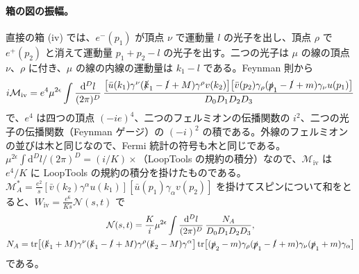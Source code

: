 \documentclass[a4paper,10pt]{ltjsarticle}
\newcommand{\dd}{\mathrm{d}}
\begin{document}
\paragraph{箱の図の振幅。}直接の箱 (iv) では、$e^-(p_1)$ が頂点 $\nu$ で運動量 $l$ の光子を出し、頂点 $\rho$ で $e^+(p_2)$ と消えて運動量 $p_1+p_2-l$ の光子を出す。二つの光子は $\mu$ の線の頂点 $\nu$、$\rho$ に付き、$\mu$ の線の内線の運動量は $k_1-l$ である。Feynman 則から
\begin{equation*}
i\mathcal M_{\mathrm{iv}}=e^4\mu^{2\epsilon}\int\frac{\dd^Dl}{(2\pi)^D}\,\frac{\bigl[\bar u(k_1)\gamma^\nu(\slashed k_1-\slashed l+M)\gamma^\rho v(k_2)\bigr]\bigl[\bar v(p_2)\gamma_\rho(\slashed p_1-\slashed l+m)\gamma_\nu u(p_1)\bigr]}{D_0D_1D_2D_3}
\end{equation*}
で、$e^4$ は四つの頂点 $(-ie)^4$、二つのフェルミオンの伝播関数の $i^2$、二つの光子の伝播関数（Feynman ゲージ）の $(-i)^2$ の積である。外線のフェルミオンの並びは木と同じなので、Fermi 統計の符号も木と同じである。$\mu^{2\epsilon}\int\dd^Dl/(2\pi)^D=(i/K)\times$（LoopTools の規約の積分）なので、$\mathcal M_{\mathrm{iv}}$ は $e^4/K$ に LoopTools の規約の積分を掛けたものである。$\mathcal M_A^*=\frac{e^2}{s}[\bar v(k_2)\gamma^\alpha u(k_1)][\bar u(p_1)\gamma_\alpha v(p_2)]$ を掛けてスピンについて和をとると、$W_{\mathrm{iv}}=\frac{e^6}{Ks}\mathcal N(s,t)$ で
\begin{equation*}
\begin{gathered}
\mathcal N(s,t)=\frac Ki\mu^{2\epsilon}\int\frac{\dd^Dl}{(2\pi)^D}\,\frac{N_A}{D_0D_1D_2D_3},\\
N_A=\mathrm{tr}\bigl[(\slashed k_1+M)\gamma^\nu(\slashed k_1-\slashed l+M)\gamma^\rho(\slashed k_2-M)\gamma^\alpha\bigr]\,\mathrm{tr}\bigl[(\slashed p_2-m)\gamma_\rho(\slashed p_1-\slashed l+m)\gamma_\nu(\slashed p_1+m)\gamma_\alpha\bigr]
\end{gathered}
\end{equation*}
である。
\end{document}
